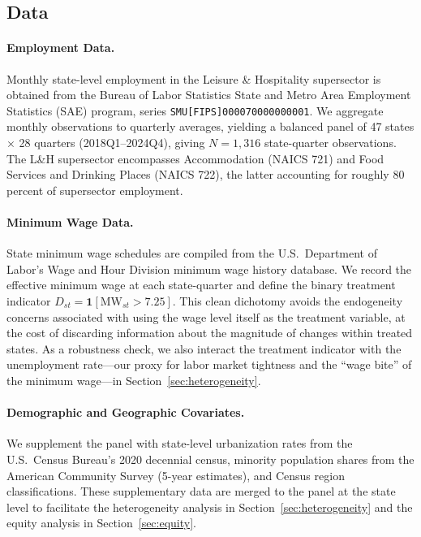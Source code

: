 \documentclass[12pt]{article}
\begin{document}
\subsection{Data}

\paragraph{Employment Data.}
Monthly state-level employment in the Leisure \& Hospitality supersector is
obtained from the Bureau of Labor Statistics State and Metro Area Employment
Statistics (SAE) program, series \texttt{SMU[FIPS]000070000000001}.  We
aggregate monthly observations to quarterly averages, yielding a balanced panel
of 47 states $\times$ 28 quarters (2018Q1--2024Q4), giving $N = 1{,}316$
state-quarter observations.  The L\&H supersector encompasses Accommodation
(NAICS 721) and Food Services and Drinking Places (NAICS 722), the latter
accounting for roughly 80 percent of supersector employment.

\paragraph{Minimum Wage Data.}
State minimum wage schedules are compiled from the U.S.\ Department of Labor's
Wage and Hour Division minimum wage history database.  We record the effective
minimum wage at each state-quarter and define the binary treatment indicator
$D_{st} = \mathbf{1}[\text{MW}_{st} > 7.25]$.  This clean dichotomy avoids
the endogeneity concerns associated with using the wage level itself as the
treatment variable, at the cost of discarding information about the magnitude
of changes within treated states.  As a robustness check, we also interact
the treatment indicator with the unemployment rate---our proxy for labor market
tightness and the ``wage bite'' of the minimum wage---in Section~\ref{sec:heterogeneity}.

\paragraph{Demographic and Geographic Covariates.}
We supplement the panel with state-level urbanization rates from the U.S.\
Census Bureau's 2020 decennial census, minority population shares from the
American Community Survey (5-year estimates), and Census region classifications.
These supplementary data are merged to the panel at the state level to
facilitate the heterogeneity analysis in Section~\ref{sec:heterogeneity} and
the equity analysis in Section~\ref{sec:equity}.
\end{document}
